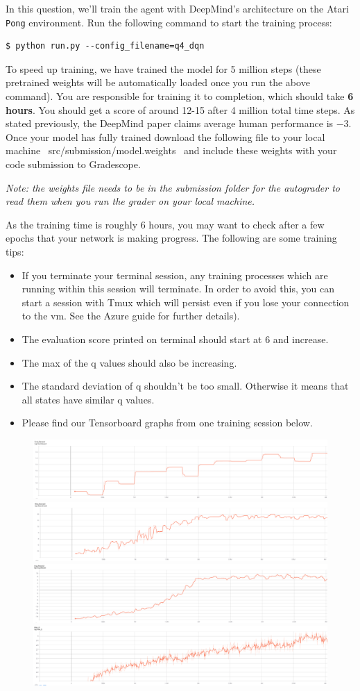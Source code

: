 \item {}

In this question, we'll train the agent with DeepMind's architecture on the Atari \texttt{Pong} environment. Run the following command to start the training process:
\begin{lstlisting}
$ python run.py --config_filename=q4_dqn
\end{lstlisting}
To speed up training, we have trained the model for 5 million steps (these pretrained weights will be automatically loaded once you run the above command). You are responsible for training it to completion, which should take \textbf{6 hours}. You should get a score of around 12-15 after 4 million total time steps.  As stated previously, the DeepMind paper claims average human performance is $ -3 $. Once your model has fully trained download the following file to your local machine ~src/submission/model.weights~ and include these weights with your code submission to Gradescope. 

\textit{Note: the weights file needs to be in the submission folder for the autograder to read them when you run the grader on your local machine.}


As the training time is roughly 6 hours, you may want to check after a few epochs that your network is making progress.  The following are some training tips:

\begin{itemize}
\item If you terminate your terminal session, any training processes which are running within this session will terminate.  In order to avoid this, you can start a session with Tmux which will persist even if you lose your connection to the vm. See the Azure guide for further details).
\item The evaluation score printed on terminal should start at 6 and increase.
\item The max of the q values should also be increasing.
\item The standard deviation of q shouldn't be too small. Otherwise it means that all states have similar q values.
\item Please find our Tensorboard graphs from one training session below.
\end{itemize}

\begin{figure}[H]
\centering
  \includegraphics[width=.4\linewidth]{images/Eval_R.png}
  \includegraphics[width=.4\linewidth]{images/Max_R.png}
  \includegraphics[width=.4\linewidth]{images/Avg_R.png}
  \includegraphics[width=.4\linewidth]{images/Max_Q.png}
\end{figure}